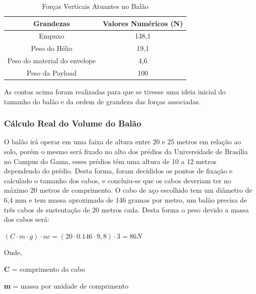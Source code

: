 	 \begin{table}[H]
		\centering
		\begin{tabular}{|c|c|}
			\hline
			\rowcolor[HTML]{FFFFFF}
			{\color[HTML]{000000} \textbf{Grandezas}} & {\color[HTML]{000000} \textbf{Valores Numéricos (N)}} \\ \hline
			Empuxo                                    & 138,1                                                 \\ \hline
			Peso do Hélio                             & 19,1                                                  \\ \hline
			Peso do material do envelope              & 4,6                                                   \\ \hline
			Peso da Payload                           & 100                                                   \\ \hline
		\end{tabular}
		\caption{Forças Verticais Atuantes no Balão}
		\label{tab:forcasVerticaisAtuantes}
	\end{table}


As contas acima foram realizadas para que se tivesse uma ideia inicial do tamanho do balão e da ordem de grandeza das forças associadas.


\subsubsection{Cálculo Real do Volume do Balão}

 O  balão irá operar em uma faixa de altura entre 20 e 25 metros em relação ao solo, porém  o mesmo será fixado no alto dos prédios da Universidade de Brasília no Campus do Gama, esses prédios têm uma altura de 10 a 12 metros dependendo do prédio. Desta forma, foram decididos os pontos de fixação e calculado o tamanho dos cabos, e concluiu-se que os cabos deveriam ter no máximo 20 metros de comprimento.
O cabo de aço escolhido tem um diâmetro de 6,4 mm e tem massa aproximada de 146 gramas por metro, um balão precisa de três cabos de sustentação de 20 metros cada. Desta forma o peso devido a massa dos cabos será:

$(C \cdot m \cdot g) \cdot nc = (20 \cdot 0.146 \cdot 9,8 ) \cdot 3 = 86 N$

Onde,

\textbf{C} = comprimento do cabo

\textbf{m} = massa por unidade de comprimento

